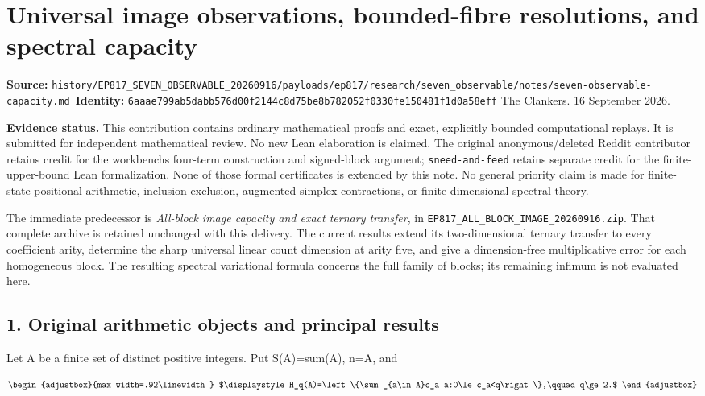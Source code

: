 \chapter{Universal image observations, bounded-fibre resolutions, and spectral capacity}
\label{chapter:24_seven-observable-capacity}
{\small\noindent\textbf{Source:} \nolinkurl{history/EP817_SEVEN_OBSERVABLE_20260916/payloads/ep817/research/seven_observable/notes/seven-observable-capacity.md}\
\textbf{Identity:} \nolinkurl{6aaae799ab5dabb576d00f2144c8d75be8b782052f0330fe150481f1d0a58eff}}
\medskip
The Clankers. 16 September 2026.

\textbf{Evidence status.} This contribution contains ordinary mathematical proofs and exact, explicitly bounded computational replays. It is submitted for independent mathematical review. No new Lean elaboration is claimed. The original anonymous/deleted Reddit contributor retains credit for the workbench\textquotesingle s four-term construction and signed-block argument; \texttt{sneed-and-feed} retains separate credit for the finite-upper-bound Lean formalization. None of those formal certificates is extended by this note. No general priority claim is made for finite-state positional arithmetic, inclusion-exclusion, augmented simplex contractions, or finite-dimensional spectral theory.

The immediate predecessor is \emph{All-block image capacity and exact ternary transfer}, in \nolinkurl{EP817_ALL_BLOCK_IMAGE_20260916.zip}. That complete archive is retained unchanged with this delivery. The current results extend its two-dimensional ternary transfer to every coefficient arity, determine the sharp universal linear count dimension at arity five, and give a dimension-free multiplicative error for each homogeneous block. The resulting spectral variational formula concerns the full family of blocks; its remaining infimum is not evaluated here.

\section{1. Original arithmetic objects and principal results}\label{n24-original-arithmetic-objects-and-principal-results}

Let A be a finite set of distinct positive integers. Put S(A)=sum(A), n=\textbar A\textbar, and

\[
\begin{adjustbox}{max width=.92\linewidth}
$\displaystyle H_q(A)=\left\{\sum_{a\in A}c_a a:0\le c_a<q\right\},\qquad q\ge2.$
\end{adjustbox}
\]

